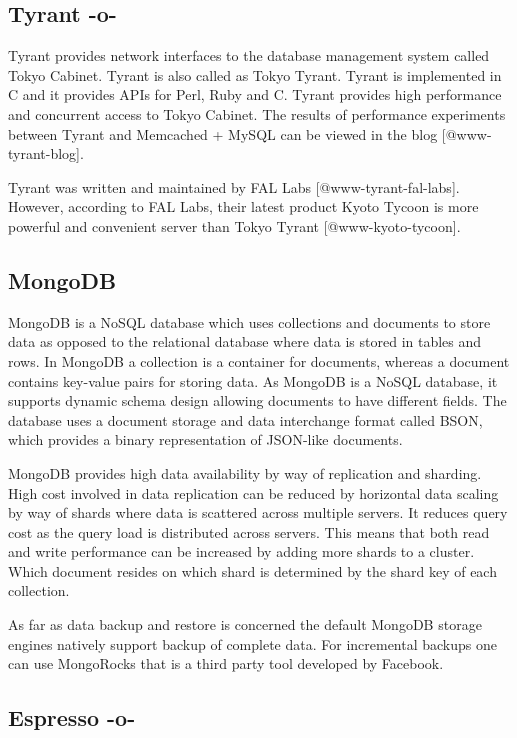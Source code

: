      
\subsection{Tyrant -o-}

Tyrant provides network interfaces to the database management system
called Tokyo Cabinet. Tyrant is also called as Tokyo Tyrant. Tyrant is
implemented in C and it provides APIs for Perl, Ruby and C. Tyrant
provides high performance and concurrent access to Tokyo Cabinet. The
results of performance experiments between Tyrant and Memcached +
MySQL can be viewed in the blog [@www-tyrant-blog].

Tyrant was written and maintained by FAL
Labs [@www-tyrant-fal-labs].  However, according to FAL Labs,
their latest product Kyoto Tycoon is more powerful and convenient
server than Tokyo Tyrant [@www-kyoto-tycoon].




\subsection{MongoDB}

MongoDB is a NoSQL database which uses collections and documents to
store data as opposed to the relational database where data is stored
in tables and rows. In MongoDB a collection is a container for
documents, whereas a document contains key-value pairs for storing
data. As MongoDB is a NoSQL database, it supports dynamic schema
design allowing documents to have different fields. The database uses
a document storage and data interchange format called BSON, which
provides a binary representation of JSON-like documents.

MongoDB provides high data availability by way of replication and
sharding. High cost involved in data replication can be reduced by
horizontal data scaling by way of shards where data is scattered
across multiple servers. It reduces query cost as the query load is
distributed across servers. This means that both read and write
performance can be increased by adding more shards to a cluster. Which
document resides on which shard is determined by the shard key of each
collection.

As far as data backup and restore is concerned the default MongoDB
storage engines natively support backup of complete data. For
incremental backups one can use MongoRocks that is a third party tool
developed by Facebook.

\subsection{Espresso -o-}

